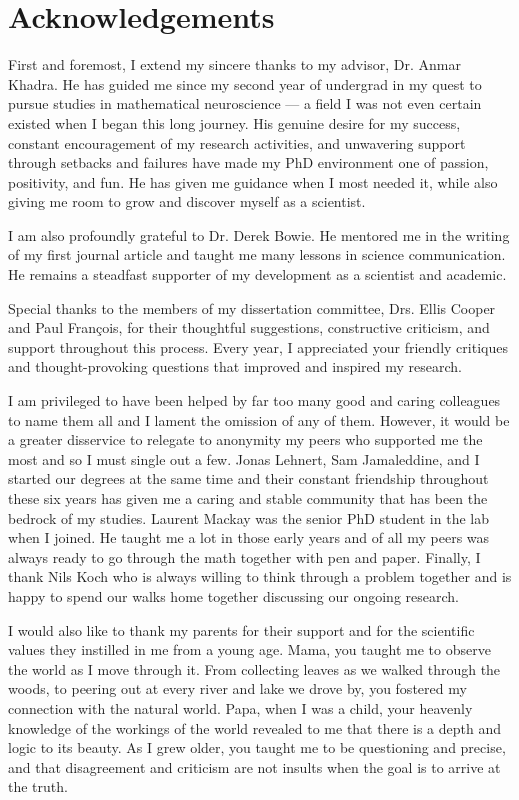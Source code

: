 \documentclass[11pt]{report}
\begin{document}
\newpage
\chapter*{Acknowledgements}

First and foremost, I extend my sincere thanks to my advisor, Dr. Anmar Khadra. He has guided me since my second year of undergrad in my quest to pursue studies in mathematical neuroscience --- a field I was not even certain existed when I began this long journey. His genuine desire for my success, constant encouragement of my research activities, and unwavering support through setbacks and failures have made my PhD environment one of passion, positivity, and fun. He has given me guidance when I most needed it, while also giving me room to grow and discover myself as a scientist. 

I am also profoundly grateful to Dr. Derek Bowie. He mentored me in the writing of my first journal article and taught me many lessons in science communication. He remains a steadfast supporter of my development as a scientist and academic.

Special thanks to the members of my dissertation committee, Drs. Ellis Cooper and Paul François, for their thoughtful suggestions, constructive criticism, and support throughout this process. Every year, I appreciated your friendly critiques and thought-provoking questions that improved and inspired my research.

I am privileged to have been helped by far too many good and caring colleagues to name them all and I lament the omission of any of them. However, it would be a greater disservice to relegate to anonymity my peers who supported me the most and so I must single out a few. Jonas Lehnert, Sam Jamaleddine, and I started our degrees at the same time and their constant friendship throughout these six years has given me a caring and stable community that has been the bedrock of my studies. Laurent Mackay was the senior PhD student in the lab when I joined. He taught me a lot in those early years and of all my peers was always ready to go through the math together with pen and paper. Finally, I thank Nils Koch who is always willing to think through a problem together and is happy to spend our walks home together discussing our ongoing research.

I would also like to thank my parents for their support and for the scientific values they instilled in me from a young age. Mama, you taught me to observe the world as I move through it. From collecting leaves as we walked through the woods, to peering out at every river and lake we drove by, you fostered my connection with the natural world. Papa, when I was a child, your heavenly knowledge of the workings of the world revealed to me that there is a depth and logic to its beauty. As I grew older, you taught me to be questioning and precise, and that disagreement and criticism are not insults when the goal is to arrive at the truth.
\end{document}
